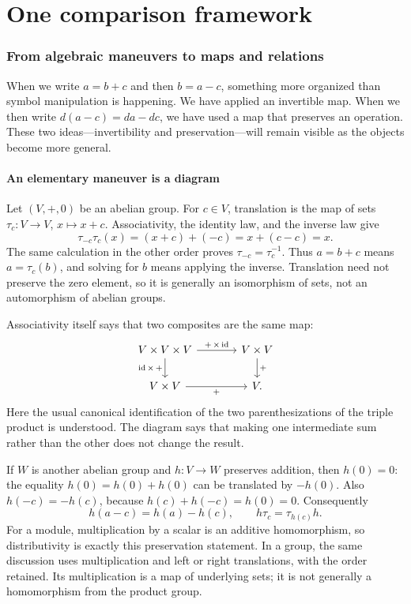 \documentclass[11pt]{article}
\theoremstyle{definition}
\theoremstyle{remark}\newtheorem{remark}[theorem]{Remark}
\newcommand{\id}{\mathrm{id}}
\begin{document}

\clearpage\begingroup\setlength{\parskip}{0pt}\tableofcontents\endgroup
\clearpage\part{One comparison framework}

\section{From algebraic maneuvers to maps and relations}
\label{f:begin}

When we write $a=b+c$ and then $b=a-c$, something more organized than
symbol manipulation is happening. We have applied an invertible map. When
we then write $d(a-c)=da-dc$, we have used a map that preserves an
operation. These two ideas---invertibility and preservation---will remain
visible as the objects become more general.

\subsection{An elementary maneuver is a diagram}

Let $(V,+,0)$ be an abelian group. For $c\in V$, translation is the map of
sets $\tau_c:V\to V$, $x\mapsto x+c$. Associativity, the identity law,
and the inverse law give
\[
\tau_{-c}\tau_c(x)=(x+c)+(-c)=x+(c-c)=x.
\]
The same calculation in the other order proves
$\tau_{-c}=\tau_c^{-1}$. Thus $a=b+c$ means $a=\tau_c(b)$, and solving
for $b$ means applying the inverse. Translation need not preserve the
zero element, so it is generally an isomorphism of sets, not an
automorphism of abelian groups.

Associativity itself says that two composites are the same map:
\[
\begin{tikzcd}[column sep=large]
V\times V\times V \arrow[r,"+\,\times\,\id"]
  \arrow[d,"\id\,\times\,+"'] & V\times V \arrow[d,"+"]\\
V\times V \arrow[r,"+"'] & V.
\end{tikzcd}
\]
Here the usual canonical identification of the two parenthesizations of
the triple product is understood. The diagram says that making one
intermediate sum rather than the other does not change the result.

If $W$ is another abelian group and $h:V\to W$ preserves addition,
then $h(0)=0$: the equality
$h(0)=h(0)+h(0)$ can be translated by $-h(0)$. Also
$h(-c)=-h(c)$, because $h(c)+h(-c)=h(0)=0$. Consequently
\[
h(a-c)=h(a)-h(c),\qquad h\tau_c=\tau_{h(c)}h.
\]
For a module, multiplication by a scalar is an additive homomorphism,
so distributivity is exactly this preservation statement. In a group,
the same discussion uses multiplication and left or right translations,
with the order retained. Its multiplication is a map of underlying
sets; it is not generally a homomorphism from the product group.
\end{document}

